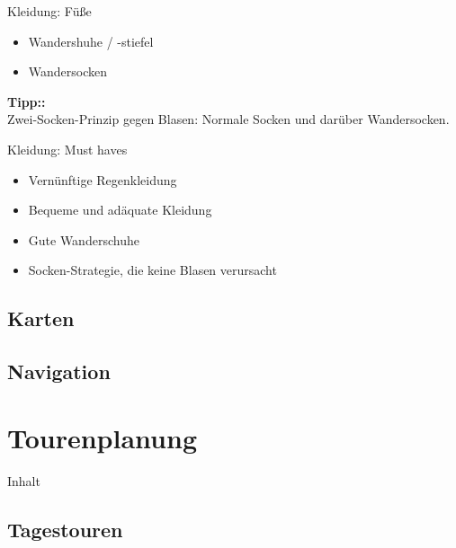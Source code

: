 \documentclass{beamer}
\newcommand{\tipp}[2][Tipp:]{\vspace{0.2cm}\textbf{#1:}\\#2}
\begin{document}
			\begin{frame}{Kleidung: Füße}
				\begin{itemize}
					\item Wandershuhe / -stiefel
					\item Wandersocken
				\end{itemize}\pause
				\tipp{Zwei-Socken-Prinzip gegen Blasen: Normale Socken und darüber Wandersocken.}
			\end{frame}
			
			\begin{frame}{Kleidung: Must haves}
				\begin{itemize}
					\item Vernünftige Regenkleidung
					\item Bequeme und adäquate Kleidung
					\item Gute Wanderschuhe
					\item Socken-Strategie, die keine Blasen verursacht
				\end{itemize}
			\end{frame}
		
		\subsection{Karten}
			
			\begin{frame}{}
			\end{frame}
		
		\subsection{Navigation}
			
			\begin{frame}{}
			\end{frame}
	
	\section{Tourenplanung}
		
		\begin{frame}[t]{Inhalt}
		\end{frame}
	
		\subsection{Tagestouren}
			
			\begin{frame}{}
			\end{frame}
			
\end{document}
